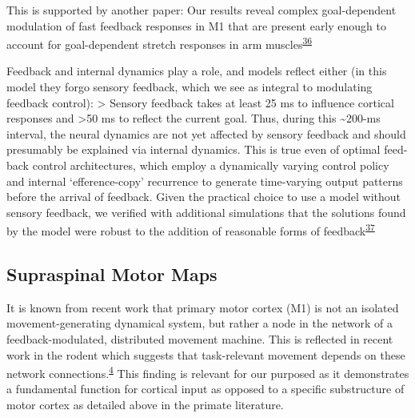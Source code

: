 \documentclass[
  a4paper,
]{article}
\begin{document}
This is supported by another paper: Our results reveal complex
goal-dependent modulation of fast feedback responses in M1 that are
present early enough to account for goal-dependent stretch responses in
arm muscles\textsuperscript{\protect\hyperlink{ref-pruszynski2014}{36}}

Feedback and internal dynamics play a role, and models reflect either
(in this model they forgo sensory feedback, which we see as integral to
modulating feedback control): \textgreater{} Sensory feedback takes at
least 25 ms to influence cortical responses and \textgreater50 ms to
reflect the current goal. Thus, during this \textasciitilde200-ms
interval, the neural dynamics are not yet affected by sensory feedback
and should presumably be explained via internal dynamics. This is true
even of optimal feed- back control architectures, which employ a
dynamically varying control policy and internal `efference-copy'
recurrence to generate time-varying output patterns before the arrival
of feedback. Given the practical choice to use a model without sensory
feedback, we verified with additional simulations that the solutions
found by the model were robust to the addition of reasonable forms of
feedback\textsuperscript{\protect\hyperlink{ref-sussillo2015}{37}}

\hypertarget{supraspinal-motor-maps}{%
\subsection{Supraspinal Motor Maps}\label{supraspinal-motor-maps}}

It is known from recent work that primary motor cortex (M1) is not an
isolated movement-generating dynamical system, but rather a node in the
network of a feedback-modulated, distributed movement machine. This is
reflected in recent work in the rodent which suggests that task-relevant
movement depends on these network
connections.\textsuperscript{\protect\hyperlink{ref-sauerbreiCorticalPatternGeneration2019}{4}}
This finding is relevant for our purposed as it demonstrates a
fundamental function for cortical input as opposed to a specific
substructure of motor cortex as detailed above in the primate
literature.
\end{document}
